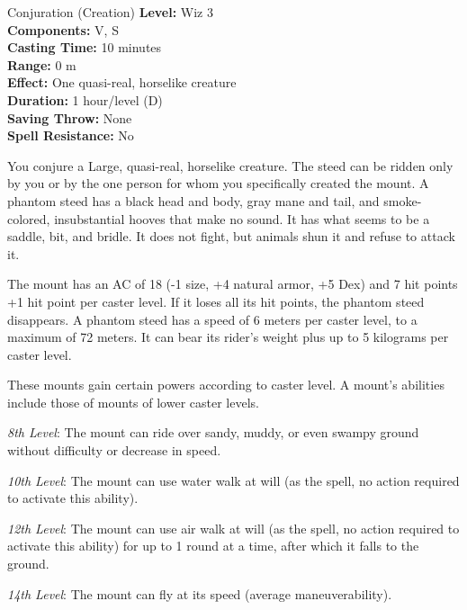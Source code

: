 {Conjuration (Creation)}
{
	\textbf{Level:}
	Wiz 3\\
	\textbf{Components:}
	V, S\\
	\textbf{Casting Time:}
	10 minutes\\
	\textbf{Range:}
	0 m\\
	\textbf{Effect:}
	One quasi-real, horselike creature\\
	\textbf{Duration:}
	1 hour/level (D)\\
	\textbf{Saving Throw:}
	None\\
	\textbf{Spell Resistance:}
	No\\
}
{
	You conjure a Large, quasi-real, horselike creature. The steed can be ridden only by you or by the one person for whom you specifically created the mount. A phantom steed has a black head and body, gray mane and tail, and smoke-colored, insubstantial hooves that make no sound. It has what seems to be a saddle, bit, and bridle. It does not fight, but animals shun it and refuse to attack it.

	The mount has an AC of 18 (-1 size, +4 natural armor, +5 Dex) and 7 hit points +1 hit point per caster level. If it loses all its hit points, the phantom steed disappears. A phantom steed has a speed of 6 meters per caster level, to a maximum of 72 meters. It can bear its rider's weight plus up to 5 kilograms per caster level.

	These mounts gain certain powers according to caster level. A mount's abilities include those of mounts of lower caster levels.

	\textit{8th Level}:
	The mount can ride over sandy, muddy, or even swampy ground without difficulty or decrease in speed.

	\textit{10th Level}:
	The mount can use water walk at will (as the spell, no action required to activate this ability).

	\textit{12th Level}:
	The mount can use air walk at will (as the spell, no action required to activate this ability) for up to 1 round at a time, after which it falls to the ground.

	\textit{14th Level}:
	The mount can fly at its speed (average maneuverability).

}
